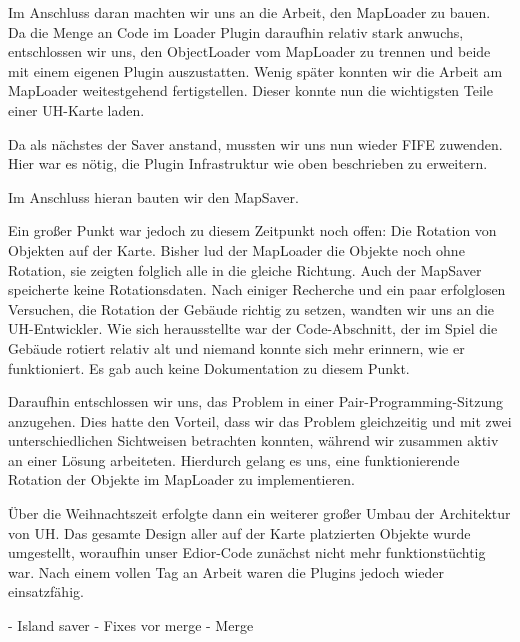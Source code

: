 Im Anschluss daran machten wir uns an die Arbeit, den MapLoader zu bauen. Da die Menge an
Code im Loader Plugin daraufhin relativ stark anwuchs, entschlossen wir uns, den ObjectLoader
vom MapLoader zu trennen und beide mit einem eigenen Plugin auszustatten. Wenig später konnten
wir die Arbeit am MapLoader weitestgehend fertigstellen. Dieser konnte nun die wichtigsten Teile
einer UH-Karte laden.

Da als nächstes der Saver anstand, mussten wir uns nun wieder FIFE zuwenden. Hier war es nötig,
die Plugin Infrastruktur wie oben beschrieben zu erweitern.

Im Anschluss hieran bauten wir den MapSaver.

Ein großer Punkt war jedoch zu diesem Zeitpunkt noch offen: Die Rotation von Objekten auf der Karte.
Bisher lud der MapLoader die Objekte noch ohne Rotation, sie zeigten folglich alle in die gleiche
Richtung. Auch der MapSaver speicherte keine Rotationsdaten. Nach einiger Recherche und ein paar
erfolglosen Versuchen, die Rotation der Gebäude richtig zu setzen, wandten wir uns an die UH-Entwickler.
Wie sich herausstellte war der Code-Abschnitt, der im Spiel die Gebäude rotiert relativ alt und
niemand konnte sich mehr erinnern, wie er funktioniert. Es gab auch keine Dokumentation zu diesem
Punkt.

Daraufhin entschlossen wir uns, das Problem in einer Pair-Programming-Sitzung anzugehen. Dies hatte
den Vorteil, dass wir das Problem gleichzeitig und mit zwei unterschiedlichen Sichtweisen betrachten
konnten, während wir zusammen aktiv an einer Lösung arbeiteten. Hierdurch gelang es uns, eine funktionierende
Rotation der Objekte im MapLoader zu implementieren.

Über die Weihnachtszeit erfolgte dann ein weiterer großer Umbau der Architektur von UH. Das gesamte
Design aller auf der Karte platzierten Objekte wurde umgestellt, woraufhin unser Edior-Code zunächst
nicht mehr funktionstüchtig war. Nach einem vollen Tag an Arbeit waren die Plugins jedoch wieder
einsatzfähig.


- Island saver
- Fixes vor merge
- Merge
